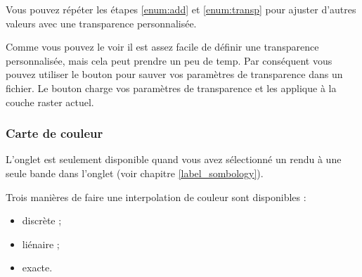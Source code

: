 Vous pouvez r\'ep\'eter les \'etapes \ref{enum:add} et \ref{enum:transp} pour ajuster
d'autres valeurs avec une transparence personnalis\'ee. 

Comme vous pouvez le voir il est assez facile de d\'efinir une transparence
personnalis\'ee, mais cela peut prendre un peu de temp. Par cons\'equent vous
pouvez utiliser le bouton  pour sauver vos param\`etres  de transparence dans un fichier. Le
bouton  
charge vos param\`etres de transparence et les applique \`a la couche raster actuel.

 \subsubsection{Carte de couleur} \label{label_colormaptab}

L'onglet  est seulement disponible quand vous avez s\'electionn\'e un
rendu \`a une seule bande dans l'onglet   (voir chapitre
\ref{label_sombology}).

Trois mani\`eres de faire une interpolation de couleur sont disponibles :
\begin{itemize}
\item discr\`ete ;
\item li\'enaire ;
\item exacte.
\end{itemize}

